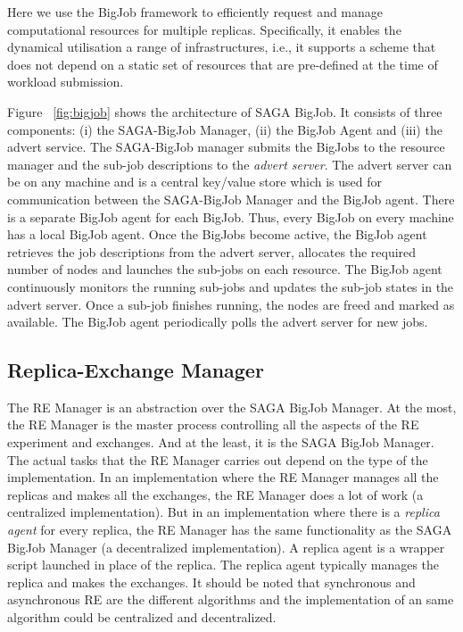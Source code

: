 \documentclass{rspublic}
\newcommand{\jhanote}[1]{ {\textcolor{red} { ***shantenu: #1 }}}
\newcommand{\athotanote}[1]{ {\textcolor{green} { ***athota: #1 }}}
\newcommand{\athotanote}[1]{}
\newcommand{\jhanote}[1]{}
\begin{document}
Here we use the BigJob framework to efficiently request and manage
computational resources for multiple replicas.  Specifically, it
enables the dynamical utilisation a range of infrastructures, i.e., it
supports a scheme that does not depend on a static set of resources
that are pre-defined at the time of workload submission.

Figure ~\ref{fig:bigjob} shows the architecture of SAGA BigJob.  It
consists of three components: (i) the SAGA-BigJob Manager, (ii) the
BigJob Agent and (iii) the advert service.  The SAGA-BigJob manager
submits the BigJobs to the resource manager and the sub-job
descriptions to the \emph{advert server}. The advert server can be on
any machine and is a central key/value store which is used for
communication between the SAGA-BigJob Manager and the BigJob
agent. There is a separate BigJob agent for each BigJob. Thus, every
BigJob on every machine has a local BigJob agent. Once the BigJobs
become active, the BigJob agent retrieves the job descriptions from
the advert server, allocates the required number of nodes and launches
the sub-jobs on each resource. The BigJob agent continuously monitors
the running sub-jobs and updates the sub-job states in the advert
server. Once a sub-job finishes running, the nodes are freed and
marked as available. The BigJob agent periodically polls the advert
server for new jobs.

\subsection{Replica-Exchange Manager}\label{repexmanager} 

  
  
The RE Manager is an abstraction over the SAGA BigJob Manager. At the most, the RE Manager is the master process controlling all the aspects of the RE experiment and exchanges. And at the least, it is the SAGA BigJob Manager. The actual tasks that the RE Manager carries out depend on the type of the implementation. In an implementation where the RE Manager manages all the replicas and makes all the exchanges, the RE Manager does a lot of work (a centralized implementation). But in an implementation where there is a \emph{replica agent} for every replica, the RE Manager has the same functionality as the SAGA BigJob Manager (a decentralized implementation). A replica agent is a wrapper script launched in place of the replica. The replica agent typically manages the replica and makes the exchanges. It should be noted that synchronous and asynchronous RE are the different algorithms and the implementation of an same algorithm could be centralized and decentralized.
\end{document}
